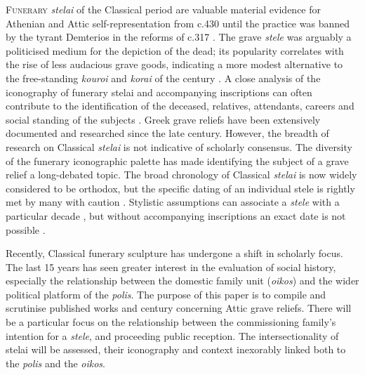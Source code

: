 \IJSRAopening%
\lettrine{F}{unerary} \textit{stelai} of the Classical period are valuable material evidence for Athenian and Attic self-representation from c.430 \BC until the practice was banned by the tyrant Demterios in the reforms of c.317 \BC \parencite[100]{Pomeroy1997}.
The grave \textit{stele} was arguably a politicised medium for the depiction of the dead; its popularity correlates with the rise of less audacious grave goods, indicating a more modest alternative to the free-standing \textit{kouroi} and \textit{korai} of the  century \BC \parencite[188]{Neer2010}.
A close analysis of the iconography of funerary stelai and accompanying inscriptions can often contribute to the identification of the deceased, relatives, attendants, careers and social standing of the subjects \parencite[20]{Burton2003}.
Greek grave reliefs have been extensively documented and researched since the late  century. However, the breadth of research on Classical \textit{stelai} is not indicative of scholarly consensus. The diversity of the funerary iconographic palette has made identifying the subject of a grave relief a long-debated topic. The broad chronology of Classical \textit{stelai} is now widely considered to be orthodox, but the specific dating of an individual stele is rightly met by many with caution \parencite[16]{Clairmont1995}.
Stylistic assumptions can associate a \textit{stele} with a particular decade \parencite[113]{Adam1966}, but without accompanying inscriptions an exact date is not possible \parencite[5]{Grossman2001}.

Recently, Classical funerary sculpture has undergone a shift in scholarly focus. The last 15 years has seen greater interest in the evaluation of social history, especially the relationship between the domestic family unit (\textit{oikos}) and the wider political platform of the \textit{polis}. The purpose of this paper is to compile and scrutinise published works  and  century concerning Attic grave reliefs. There will be a particular focus on the relationship between the commissioning family’s intention for a \textit{stele}, and proceeding public reception. The intersectionality of stelai will be assessed, their iconography and context inexorably linked both to the \textit{polis} and the \textit{oikos}.

